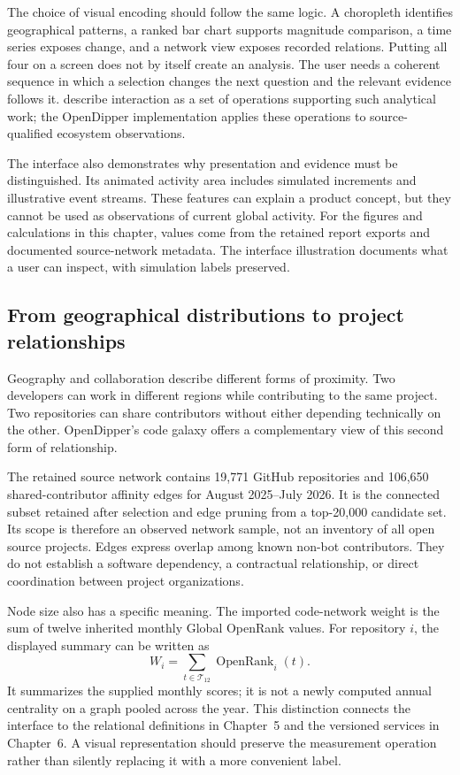 The choice of visual encoding should follow the same logic. A choropleth identifies geographical patterns, a ranked bar chart supports magnitude comparison, a time series exposes change, and a network view exposes recorded relations. Putting all four on a screen does not by itself create an analysis. The user needs a coherent sequence in which a selection changes the next question and the relevant evidence follows it. \citet{heer2012} describe interaction as a set of operations supporting such analytical work; the OpenDipper implementation applies these operations to source-qualified ecosystem observations.

The interface also demonstrates why presentation and evidence must be distinguished. Its animated activity area includes simulated increments and illustrative event streams. These features can explain a product concept, but they cannot be used as observations of current global activity. For the figures and calculations in this chapter, values come from the retained report exports and documented source-network metadata. The interface illustration documents what a user can inspect, with simulation labels preserved.

\subsection{From geographical distributions to project relationships}
Geography and collaboration describe different forms of proximity. Two developers can work in different regions while contributing to the same project. Two repositories can share contributors without either depending technically on the other. OpenDipper's code galaxy offers a complementary view of this second form of relationship.

The retained source network contains 19,771 GitHub repositories and 106,650 shared-contributor affinity edges for August 2025--July 2026. It is the connected subset retained after selection and edge pruning from a top-20,000 candidate set. Its scope is therefore an observed network sample, not an inventory of all open source projects. Edges express overlap among known non-bot contributors. They do not establish a software dependency, a contractual relationship, or direct coordination between project organizations.

Node size also has a specific meaning. The imported code-network weight is the sum of twelve inherited monthly Global OpenRank values. For repository \(i\), the displayed summary can be written as
\begin{equation}
W_i=\sum_{t\in\mathcal T_{12}}\operatorname{OpenRank}_i(t).
\label{eq:ch10-window-score}
\end{equation}
It summarizes the supplied monthly scores; it is not a newly computed annual centrality on a graph pooled across the year. This distinction connects the interface to the relational definitions in Chapter~5 and the versioned services in Chapter~6. A visual representation should preserve the measurement operation rather than silently replacing it with a more convenient label.

